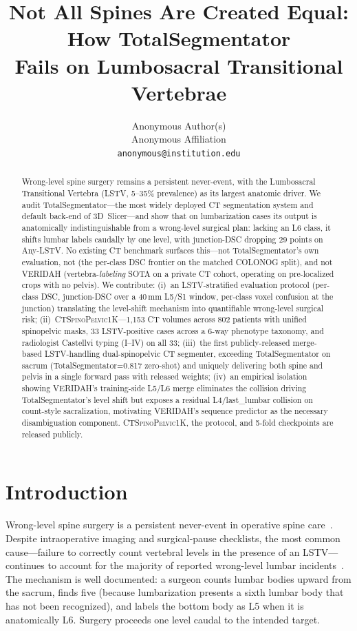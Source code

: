 \documentclass{article}
\title{Not All Spines Are Created Equal: How TotalSegmentator\\
Fails on Lumbosacral Transitional Vertebrae}
\author{%
  Anonymous Author(s) \\
  Anonymous Affiliation \\
  \texttt{anonymous@institution.edu}
}
\newcommand{\dataset}{\textsc{CTSpinoPelvic1K}}
\newcommand{\TS}{TotalSegmentator}
\newcommand{\VERIDAH}{VERIDAH}
\begin{document}
\maketitle

\begin{abstract}
Wrong-level spine surgery remains a persistent
never-event, with the Lumbosacral Transitional Vertebra
(LSTV, 5--35\% prevalence) as its largest anatomic
driver. We audit \TS{}---the most widely deployed CT
segmentation system and default back-end of
3D~Slicer---and show that on lumbarization cases its
output is anatomically indistinguishable from a
wrong-level surgical plan: lacking an L6 class, it
shifts lumbar labels caudally by one level, with
junction-DSC dropping 29 points on Any-LSTV. No
existing CT benchmark surfaces this---not \TS{}'s own
evaluation, not \citet{Li2025LumbarMechanism} (the
per-class DSC frontier on the matched COLONOG split),
and not \VERIDAH{} (vertebra-\emph{labeling} SOTA on a
private CT cohort, operating on pre-localized crops
with no pelvis). We
contribute: (i)~an LSTV-stratified evaluation protocol
(per-class DSC, junction-DSC over a 40\,mm L5/S1
window, per-class voxel confusion at the junction)
translating the level-shift mechanism into quantifiable
wrong-level surgical risk;
(ii)~\dataset{}---1{,}153 CT volumes across 802
patients with unified spinopelvic masks, 33
LSTV-positive cases across a 6-way phenotype taxonomy,
and radiologist Castellvi typing (I--IV) on
all 33; (iii)~the first publicly-released
merge-based LSTV-handling dual-spinopelvic CT segmenter,
exceeding \TS{} on sacrum (\TS{}=0.817 zero-shot) and
uniquely delivering both spine and pelvis in a single
forward pass with released weights; (iv)~an empirical
isolation showing
\VERIDAH{}'s training-side L5/L6 merge eliminates the
collision driving \TS{}'s level shift but exposes a
residual L4/last\_lumbar collision on count-style
sacralization, motivating \VERIDAH{}'s sequence
predictor as the necessary disambiguation component.
\dataset{}, the protocol, and 5-fold checkpoints are
released publicly.
\end{abstract}

\section{Introduction}
\label{sec:intro}

Wrong-level spine surgery is a persistent never-event in
operative spine
care~\citep{Konin2010LumbosacralRelevance}. Despite
intraoperative imaging and surgical-pause checklists, the
most common cause---failure to correctly count vertebral
levels in the presence of an LSTV---continues to account for
the majority of reported wrong-level lumbar
incidents~\citep{Carrino2011EffectImaging}. The mechanism is
well documented: a surgeon counts lumbar bodies upward from
the sacrum, finds five (because lumbarization presents a
sixth lumbar body that has not been recognized), and labels
the bottom body as L5 when it is anatomically L6. Surgery
proceeds one level caudal to the intended target.
\end{document}
